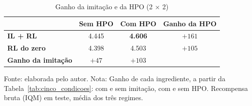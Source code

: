 \begin{table}[htbp]
\centering
\small\setlength{\tabcolsep}{4pt}
\caption{Ganho da imitação e da HPO (2 $\times$ 2)}
\label{tab:quadrantes}
\begin{tabular}{l c c c}
\hline
& \textbf{Sem HPO} & \textbf{Com HPO} & \textbf{Ganho da HPO} \\ \hline
\textbf{IL + RL} & 4.445 & \textbf{4.606} & $+161$ \\
\textbf{RL do zero} & 4.398 & 4.503 & $+105$ \\ \hline
\textbf{Ganho da imitação} & $+47$ & $+103$ & \\
\hline
\end{tabular}

{\footnotesize Fonte: elaborada pelo autor. Nota: Ganho de cada ingrediente, a partir da Tabela~\ref{tab:cinco_condicoes}: com e sem imitação, com e sem HPO. Recompensa bruta (IQM) em teste, média dos três regimes.}
\end{table}
